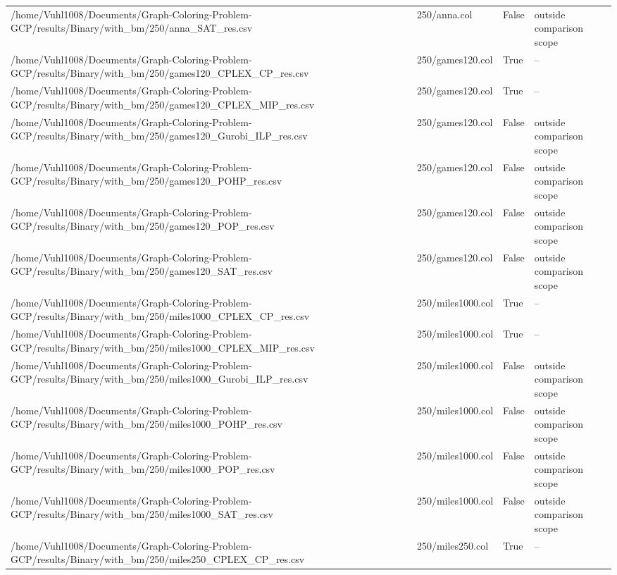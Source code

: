 \begin{table}[htbp]
\begin{tabular}{llll}
/home/Vuhl1008/Documents/Graph-Coloring-Problem-GCP/results/Binary/with\_bm/250/anna\_SAT\_res.csv & 250/anna.col & False & outside comparison scope \\
/home/Vuhl1008/Documents/Graph-Coloring-Problem-GCP/results/Binary/with\_bm/250/games120\_CPLEX\_CP\_res.csv & 250/games120.col & True & -- \\
/home/Vuhl1008/Documents/Graph-Coloring-Problem-GCP/results/Binary/with\_bm/250/games120\_CPLEX\_MIP\_res.csv & 250/games120.col & True & -- \\
/home/Vuhl1008/Documents/Graph-Coloring-Problem-GCP/results/Binary/with\_bm/250/games120\_Gurobi\_ILP\_res.csv & 250/games120.col & False & outside comparison scope \\
/home/Vuhl1008/Documents/Graph-Coloring-Problem-GCP/results/Binary/with\_bm/250/games120\_POHP\_res.csv & 250/games120.col & False & outside comparison scope \\
/home/Vuhl1008/Documents/Graph-Coloring-Problem-GCP/results/Binary/with\_bm/250/games120\_POP\_res.csv & 250/games120.col & False & outside comparison scope \\
/home/Vuhl1008/Documents/Graph-Coloring-Problem-GCP/results/Binary/with\_bm/250/games120\_SAT\_res.csv & 250/games120.col & False & outside comparison scope \\
/home/Vuhl1008/Documents/Graph-Coloring-Problem-GCP/results/Binary/with\_bm/250/miles1000\_CPLEX\_CP\_res.csv & 250/miles1000.col & True & -- \\
/home/Vuhl1008/Documents/Graph-Coloring-Problem-GCP/results/Binary/with\_bm/250/miles1000\_CPLEX\_MIP\_res.csv & 250/miles1000.col & True & -- \\
/home/Vuhl1008/Documents/Graph-Coloring-Problem-GCP/results/Binary/with\_bm/250/miles1000\_Gurobi\_ILP\_res.csv & 250/miles1000.col & False & outside comparison scope \\
/home/Vuhl1008/Documents/Graph-Coloring-Problem-GCP/results/Binary/with\_bm/250/miles1000\_POHP\_res.csv & 250/miles1000.col & False & outside comparison scope \\
/home/Vuhl1008/Documents/Graph-Coloring-Problem-GCP/results/Binary/with\_bm/250/miles1000\_POP\_res.csv & 250/miles1000.col & False & outside comparison scope \\
/home/Vuhl1008/Documents/Graph-Coloring-Problem-GCP/results/Binary/with\_bm/250/miles1000\_SAT\_res.csv & 250/miles1000.col & False & outside comparison scope \\
/home/Vuhl1008/Documents/Graph-Coloring-Problem-GCP/results/Binary/with\_bm/250/miles250\_CPLEX\_CP\_res.csv & 250/miles250.col & True & -- \\

\end{tabular}
\end{table}
